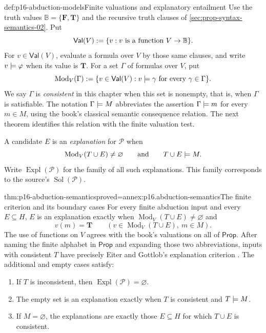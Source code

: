 \begin{hbdefinition}{def:p16-abduction-models}{Finite valuations and explanatory entailment}
Use the truth values \(\mathbb{B}=\{\mathbf{F},\mathbf{T}\}\) and the recursive
truth clauses of \cref{sec:prop-syntax-semantics-02}. Put
\[
 \mathsf{Val}(V)\mathrel{:=}\{v:v\text{ is a function }V\to\mathbb{B}\}.
\]
For \(v\in\mathsf{Val}(V)\), evaluate a formula over \(V\) by those
same clauses, and write \(v\models\varphi\) when its value is
\(\mathbf{T}\). For a set \(\Gamma\) of formulas over \(V\), put
\[
 \operatorname{Mod}_V(\Gamma)
   \mathrel{:=}\{v\in\mathsf{Val}(V):
                  v\models\gamma\text{ for every }\gamma\in\Gamma\}.
\]
We say \(\Gamma\) is \emph{consistent} in this chapter when this set
is nonempty, that is, when \(\Gamma\) is satisfiable. The notation
\(\Gamma\models M\) abbreviates the assertion
\(\Gamma\models m\) for every \(m\in M\), using the book's
classical semantic consequence relation. The next theorem identifies this
relation with the finite valuation test.

A candidate \(E\) is an \emph{explanation} for \(\mathcal P\) when
\[
 \operatorname{Mod}_V(T\cup E)\ne\varnothing
       \qquad\text{and}\qquad T\cup E\models M.
\]
Write \(\operatorname{Expl}(\mathcal P)\) for the family of all such
explanations. This family corresponds to the source's
\(\operatorname{Sol}(\mathcal P)\).
\end{hbdefinition}

\begin{hbtheorem}{thm:p16-abduction-semantics}{proved=annex:p16.abduction-semantics}{The finite criterion and its boundary cases}
For every finite abduction input and every \(E\subseteq H\),
\(E\) is an explanation exactly when
\(\operatorname{Mod}_V(T\cup E)\ne\varnothing\) and
\[
 v(m)=\mathbf{T}\qquad
  (v\in\operatorname{Mod}_V(T\cup E),\ m\in M).
\]
The use of functions on \(V\) agrees with the book's valuations on all
of \(\mathsf{Prop}\). After naming the finite alphabet in \(\mathsf{Prop}\) and
expanding those two abbreviations, inputs with consistent \(T\) have
precisely Eiter and Gottlob's explanation criterion
\cite[defs.~2.1--2.2, manuscript pp.~9--10]{EiterGottlobAbductionManuscript}.
The additional and empty cases satisfy:
\begin{enumerate}
\item If \(T\) is inconsistent, then
      \(\operatorname{Expl}(\mathcal P)=\varnothing\).
\item The empty set is an explanation exactly when \(T\) is consistent
      and \(T\models M\).
\item If \(M=\varnothing\), the explanations are exactly those
      \(E\subseteq H\) for which \(T\cup E\) is consistent.
\end{enumerate}
\end{hbtheorem}

